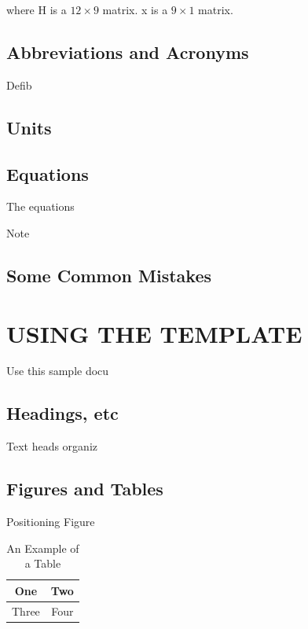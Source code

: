 \documentclass[letterpaper, 10 pt, conference]{ieeeconf}  %
\begin{document}
\noindent
where H is a \(12 \times 9\) matrix. x is a \(9 \times 1\) matrix.




\subsection{Abbreviations and Acronyms}
Defib

\subsection{Units}



\subsection{Equations}

The equations



Note

\subsection{Some Common Mistakes}

\section{USING THE TEMPLATE}

Use this sample docu

\subsection{Headings, etc}

Text heads organiz

\subsection{Figures and Tables}

Positioning Figure



\begin{table}[h]
\caption{An Example of a Table}
\label{table_example}
\begin{center}
\begin{tabular}{|c||c|}
\hline
One & Two\\
\hline
Three & Four\\
\hline
\end{tabular}
\end{center}
\end{table}
\end{document}
